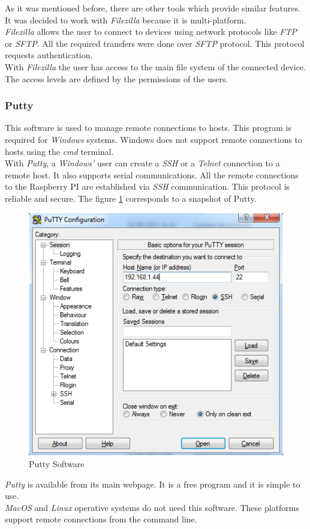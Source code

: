 As it was mentioned before, there are other tools which provide similar features. It was decided to work with \textit{Filezilla} because it is multi-platform.\\

\textit{Filezilla} allows the user to connect to devices using network protocols like \textit{FTP} or \textit{SFTP}. All the required transfers were done over \textit{SFTP} protocol. This protocol requests authentication.\\

With \textit{Filezilla} the user has access to the main file system of the connected device. The access levels are defined by the permissions of the users.

\subsubsection{Putty}

This software is used to manage remote connections to hosts. This program is required for \textit{Windows} systems. Windows does not support remote connections to hosts using the \textit{cmd} terminal.\\

With \textit{Putty}, a \textit{Windows'} user can create a \textit{SSH} or a \textit{Telnet} connection to a remote host. It also supports serial communications. All the remote connections to the Raspberry PI are established via \textit{SSH} communication. This protocol is reliable and secure. The figure \ref{PUTTY} corresponds to a snapshot of Putty.\\

\begin{figure}[H]
\begin{centering}
\includegraphics[scale=0.7]{IMGS/PUTTY.PNG}
\caption{Putty Software \label{PUTTY}}
\end{centering}
\end{figure}

\textit{Putty} is available from its main webpage. It is a free program and it is simple to use.\\

\textit{MacOS} and \textit{Linux} operative systems do not need this software. These platforms support remote connections from the command line.

\newpage
\newpage
